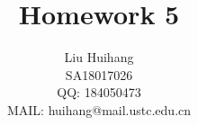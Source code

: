 
\title{
    Homework 5
}

\author{\name Liu Huihang  \\
        \addr SA18017026  \\
        QQ: 184050473 \\
        MAIL: huihang@mail.ustc.edu.cn
}


\maketitle